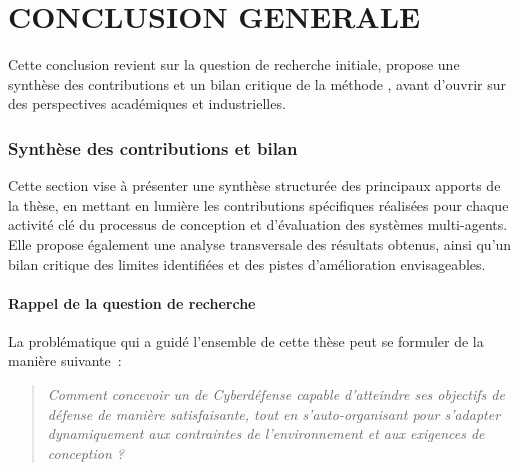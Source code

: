 \clearpage
\thispagestyle{empty}
\null
\newpage

\cleardoublepage
{}
\part*{CONCLUSION GENERALE}
\label{part:conclusion}

\clearpage
\thispagestyle{empty}
\null
\newpage


\noindent
Cette conclusion revient sur la question de recherche initiale, propose une synthèse des contributions et un bilan critique de la méthode , avant d'ouvrir sur des perspectives académiques et industrielles.

\section*{Synthèse des contributions et bilan}
\label{sec:synthese_bilan}

\noindent
Cette section vise à présenter une synthèse structurée des principaux apports de la thèse, en mettant en lumière les contributions spécifiques réalisées pour chaque activité clé du processus de conception et d'évaluation des systèmes multi-agents. Elle propose également une analyse transversale des résultats obtenus, ainsi qu'un bilan critique des limites identifiées et des pistes d'amélioration envisageables.

\subsection*{Rappel de la question de recherche}

\noindent
La problématique qui a guidé l'ensemble de cette thèse peut se formuler de la manière suivante~:

\begin{quote}
  \emph{Comment concevoir un  de Cyberdéfense capable d'atteindre ses objectifs de défense de manière satisfaisante, tout en s'auto-organisant pour s'adapter dynamiquement aux contraintes de l'environnement et aux exigences de conception ?}
\end{quote}

